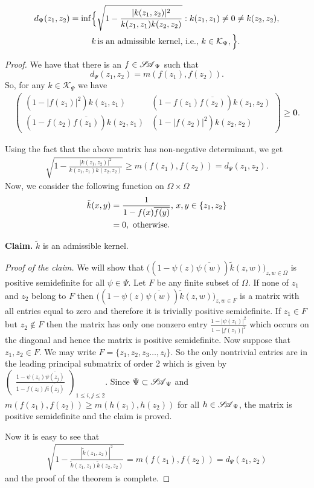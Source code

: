 \documentclass[10pt,a4paper]{amsart}
\newcommand{\SA}{\mathscr{S\mspace{-5mu}A}}
\begin{document}
\begin{theorem}
	\begin{align}\label{d_in_terms_of_adm_kernels}
		d_\Psi (z_1,z_2)=\inf& \Big\{\sqrt{1-\frac{|k(z_1, z_2)|^2}{k(z_1,z_1)k(z_2,z_2)}}: k(z_1,z_1)\neq 0\neq k(z_2,z_2),\\
		& k\,\text{is an admissible kernel, i.e., }k\in \mathcal{K}_\Psi, \Big\}.\notag
	\end{align}
\end{theorem}

\begin{proof}
	We have that there is an $f\in \SA_\Psi$ such that $$d_\Psi (z_1,z_2)=m(f(z_1), f(z_2)).$$
	So, for any $k\in \mathcal{K}_\Psi$ we have
	\begin{align*}\begin{pmatrix}
			(1-|f(z_1)|^2)k(z_1,z_1)& (1- f(z_1) \overline{f(z_2)})k(z_1,z_2)\\
			(1- f(z_2) \overline{f(z_1)})k(z_2,z_1)& 	(1-|f(z_2)|^2)k(z_2,z_2)
		\end{pmatrix} \geq \mathbf{0}.
	\end{align*} 
	
	Using the fact that the above matrix has non-negative determinant, we get 
	\begin{align*}
		\sqrt{1-\frac{|k(z_1, z_2)|^2}{k(z_1,z_1)k(z_2,z_2)}}\geq m(f(z_1), f(z_2))=d_\Psi (z_1,z_2).
	\end{align*}
	Now, we consider the following function on $\Omega\times\Omega$
	\begin{align}\label{kernel_associated_to_function}
		\tilde{k}(x,y)&=\frac{1}{1- f(x)\overline{f(y)}},\,x,y\in\{z_1,z_2\}\\
		&=0,\,\,\text{otherwise}.\notag
	\end{align}
	
	\textbf{Claim.} $\tilde{k}$ is an admissible kernel.
	
	\textit{Proof of the claim.} We will show that $\big((1-\psi(z)\overline{\psi(w)})\tilde{k}(z,w)\big)_{z,w\in \Omega}$ is positive semidefinite for all $\psi\in\Psi$. Let $F$ be any finite subset of $\Omega$. If none of $z_1$ and $z_2$ belong to $F$ then $\big((1-\psi(z)\overline{\psi(w)})\tilde{k}(z,w)\big)_{z,w\in F}$ is a matrix with all entries equal to zero and therefore it is trivially positive semidefinite. If $z_1\in F$ but $z_2\notin F$ then the matrix has only one nonzero entry $\frac{1-|\psi(z_1)|^2}{1-|f(z_1)|^2}$ which occurs on the diagonal and hence the matrix is positive semidefinite. Now suppose that $z_1,z_2\in F$. We may write $F=\{z_1,z_2,z_3\ldots,z_l\}$. So the only nontrivial entries are in the leading principal submatrix of order 2 which is given by $\begin{pmatrix}
		\frac{1-\psi(z_i)\overline{\psi(z_j)}}{1-f(z_i)\overline{fi(z_j)}}
	\end{pmatrix}_{1\leq i,j\leq 2}.$ Since $\Psi\subset \SA_\Psi$ and $m(f(z_1),f(z_2))\geq m(h(z_1),h(z_2))$ for all $h \in \SA_\Psi$, the matrix is positive semidefinite and the claim is proved.
	
	
	Now it is easy to see that
	\begin{align*}
		\sqrt{1-\frac{|\tilde{k}(z_1, z_2)|^2}{\tilde{k}(z_1,z_1)\tilde{k}(z_2,z_2)}}=m(f(z_1), f(z_2))=d_\Psi (z_1,z_2)
	\end{align*}
	and the proof of the theorem is complete.
\end{proof}
\end{document}
